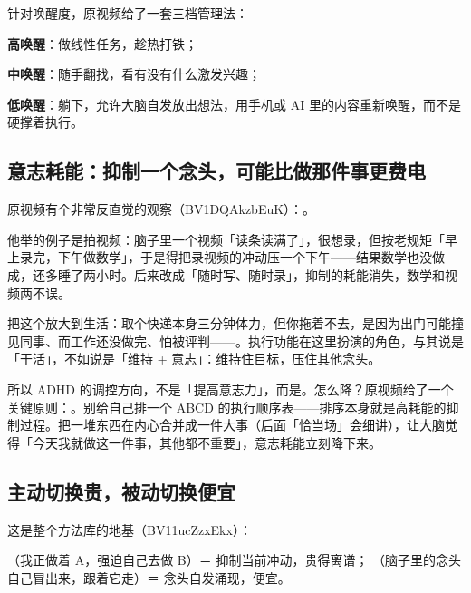 针对唤醒度，原视频给了一套三档管理法：

\begin{checklist}
  \item \textbf{高唤醒}：做线性任务，趁热打铁；
  \item \textbf{中唤醒}：随手翻找，看有没有什么激发兴趣；
  \item \textbf{低唤醒}：躺下，允许大脑自发放出想法，用手机或 AI 里的内容重新唤醒，而不是硬撑着执行。
\end{checklist}


\subsection{意志耗能：抑制一个念头，可能比做那件事更费电}

原视频有个非常反直觉的观察（BV1DQAkzbEuK）：。

他举的例子是拍视频：脑子里一个视频「读条读满了」，很想录，但按老规矩「早上录完，下午做数学」，于是得把录视频的冲动压一个下午——结果数学也没做成，还多睡了两小时。后来改成「随时写、随时录」，抑制的耗能消失，数学和视频两不误。

把这个放大到生活：取个快递本身三分钟体力，但你拖着不去，是因为出门可能撞见同事、而工作还没做完、怕被评判——。执行功能在这里扮演的角色，与其说是「干活」，不如说是「维持 + 意志」：维持住目标，压住其他念头。

\begin{insight}
所以 ADHD 的调控方向，不是「提高意志力」，而是。怎么降？原视频给了一个关键原则：。别给自己排一个 ABCD 的执行顺序表——排序本身就是高耗能的抑制过程。把一堆东西在内心合并成一件大事（后面「恰当场」会细讲），让大脑觉得「今天我就做这一件事，其他都不重要」，意志耗能立刻降下来。
\end{insight}

\subsection{主动切换贵，被动切换便宜}

这是整个方法库的地基（BV11ucZzxEkx）：

（我正做着 A，强迫自己去做 B）＝ 抑制当前冲动，贵得离谱；
（脑子里的念头自己冒出来，跟着它走）＝ 念头自发涌现，便宜。

